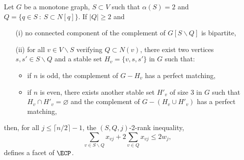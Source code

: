 \begin{tthm} \label{T2RANK2}
Let $G$ be a monotone graph, $S \subset V$ such that $\alpha(S) = 2$ and $Q = \{ q \in S ~:~ S \subset N[q] \}$.
If $|Q| \geq 2$ and
\begin{enumerate}
\item[(i)] no connected component of the complement of $G[S \backslash Q]$ is bipartite,
\item[(ii)] for all $v \in V \backslash S$ verifying $Q \subset N(v)$, there exist two
vertices $s, s' \in S \backslash Q$ and a stable set $H_v = \{v, s, s'\}$ in $G$ such that:
\begin{itemize}
\item if $n$ is odd, the complement of $G-H_v$ has a perfect matching,
\item if $n$ is even, there exists another stable set $H'_v$ of size 3 in $G$ such that
$H_v \cap H'_v = \varnothing$ and the complement of $G - (H_v \cup H'_v)$ has a perfect matching,
\end{itemize}
\end{enumerate}
then, for all $j \leq \lceil n/2 \rceil - 1$, the $(S,Q,j)$-2-rank inequality, \ie
\begin{equation} \label{R2RANK2AGAIN}
\sum_{v \in S\backslash Q} x_{vj} + 2 \sum_{v \in Q} x_{vj} \leq 2 w_j,
\end{equation}
defines a facet of $\ECP$.
\end{tthm}
